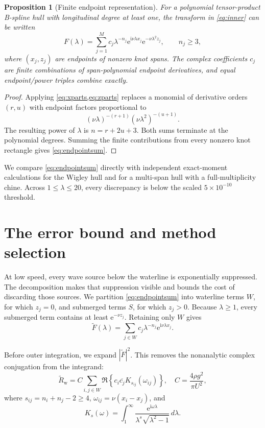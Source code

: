 \documentclass[10pt]{article}
\newtheorem{proposition}{Proposition}
\newcommand{\iu}{\mathrm{i}}
\newcommand{\e}{\mathrm{e}}
\begin{document}
\begin{proposition}[Finite endpoint representation]
For a polynomial tensor-product B-spline hull with longitudinal degree at least
one, the transform in \cref{eq:inner} can be written
\begin{equation}
 F(\lambda)=\sum_{j=1}^{M} c_j\lambda^{-n_j}
 \e^{\iu\nu\lambda x_j}\e^{-\nu\lambda^2z_j},
 \qquad n_j\geq3,
 \label{eq:endpointsum}
\end{equation}
where \((x_j,z_j)\) are endpoints of nonzero knot spans.  The complex
coefficients \(c_j\) are finite combinations of span-polynomial endpoint
derivatives, and equal endpoint/power triples combine exactly.
\end{proposition}

\begin{proof}
Applying \cref{eq:xparts,eq:zparts} replaces a monomial of derivative orders
\((r,u)\) with endpoint factors proportional to
\[
(\nu\lambda)^{-(r+1)}(\nu\lambda^2)^{-(u+1)}.
\]
The resulting power of \(\lambda\) is \(n=r+2u+3\).  Both sums terminate at
the polynomial degrees.  Summing the finite contributions from every nonzero
knot rectangle gives \cref{eq:endpointsum}.
\end{proof}

We compare \cref{eq:endpointsum} directly with independent exact-moment
calculations for the Wigley hull and for a multi-span hull with a
full-multiplicity chine.  Across \(1\leq\lambda\leq20\), every discrepancy is
below the scaled \(5\times10^{-10}\) threshold.

\section{The error bound and method selection}
\label{sec:bound}

At low speed, every wave source below the waterline is exponentially
suppressed.  The decomposition makes that suppression visible and bounds the
cost of discarding those sources.  We partition \cref{eq:endpointsum} into
waterline terms \(W\), for which \(z_j=0\), and submerged terms \(S\), for
which \(z_j>0\).  Because \(\lambda\geq1\), every submerged term contains at
least \(\e^{-\nu z_j}\).  Retaining only \(W\) gives
\begin{equation}
 \widetilde F(\lambda)=\sum_{j\in W}c_j\lambda^{-n_j}
 \e^{\iu\nu\lambda x_j}.
 \label{eq:waterline}
\end{equation}

Before outer integration, we expand \(|\widetilde F|^2\).  This removes the
nonanalytic complex conjugation from the integrand:
\begin{equation}
 \widetilde R_{\mathrm w}=C
 \sum_{i,j\in W}\Re\!\left\{
 c_i\overline{c_j}K_{s_{ij}}(\omega_{ij})\right\},
 \quad
 C=\frac{4\rho g^2}{\pi U^2},
 \label{eq:pairresistance}
\end{equation}
where \(s_{ij}=n_i+n_j-2\geq4\),
\(\omega_{ij}=\nu(x_i-x_j)\), and
\begin{equation}
 K_s(\omega)=\int_1^\infty
 \frac{\e^{\iu\omega\lambda}}{
 \lambda^s\sqrt{\lambda^2-1}}\,d\lambda.
 \label{eq:kernel}
\end{equation}
\end{document}
